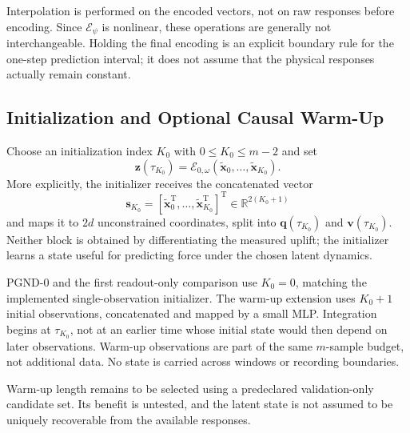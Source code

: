 \documentclass[journal,twoside]{IEEEtran}
\begin{document}
Interpolation is performed on the encoded vectors, not on raw responses
before encoding. Since $\mathcal E_\psi$ is nonlinear, these operations
are generally not interchangeable. Holding the final encoding is an
explicit boundary rule for the one-step prediction interval; it does not
assume that the physical responses actually remain constant.

\subsection{Initialization and Optional Causal Warm-Up}
\label{subsec:initialization}
Choose an initialization index $K_0$ with $0\leq K_0\leq m-2$ and set
\begin{equation}
    \mathbf z(\tau_{K_0})=
    \mathcal E_{0,\omega}
    (\tilde{\mathbf x}_0,\ldots,\tilde{\mathbf x}_{K_0}).
    \label{eq:initial_state}
\end{equation}
More explicitly, the initializer receives the concatenated vector
\begin{equation}
    \mathbf s_{K_0}=
    [\tilde{\mathbf x}_0^{\mathrm T},\ldots,
     \tilde{\mathbf x}_{K_0}^{\mathrm T}]^{\mathrm T}
    \in\mathbb R^{2(K_0+1)}
    \label{eq:initializer_input}
\end{equation}
and maps it to $2d$ unconstrained coordinates, split into
$\mathbf q(\tau_{K_0})$ and $\mathbf v(\tau_{K_0})$.
Neither block is obtained by differentiating the measured uplift; the
initializer learns a state useful for predicting force under the chosen
latent dynamics.

PGND-0 and the first readout-only comparison use $K_0=0$, matching the
implemented single-observation initializer. The warm-up extension uses
$K_0+1$ initial observations, concatenated and mapped by a small MLP.
Integration begins at $\tau_{K_0}$, not at an earlier time whose initial
state would then depend on later observations. Warm-up observations are
part of the same $m$-sample budget, not additional data. No state is
carried across windows or recording boundaries.

Warm-up length remains to be selected using a predeclared validation-only
candidate set. Its benefit is untested, and the latent state is not assumed
to be uniquely recoverable from the available responses.
\end{document}
